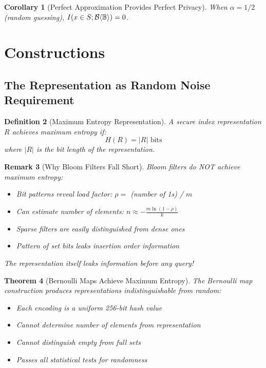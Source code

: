 \documentclass[11pt,final,hidelinks]{article}
\newcommand{\BernBool}{\mathcal{B}\langle \Bool \rangle}
\newcommand{\fprate}{\alpha}
\newtheorem{theorem}{Theorem}[section]
\newtheorem{corollary}[theorem]{Corollary}
\newtheorem{definition}[theorem]{Definition}
\newtheorem{remark}[theorem]{Remark}
\begin{document}
\begin{corollary}[Perfect Approximation Provides Perfect Privacy]
When $\fprate = 1/2$ (random guessing), $\MutInfo{x \in S}{\BernBool} = 0$.
\end{corollary}

\section{Constructions}

\subsection{The Representation as Random Noise Requirement}

\begin{definition}[Maximum Entropy Representation]
A secure index representation $R$ achieves maximum entropy if:
\begin{equation}
H(R) = |R| \text{ bits}
\end{equation}
where $|R|$ is the bit length of the representation.
\end{definition}

\begin{remark}[Why Bloom Filters Fall Short]
Bloom filters do NOT achieve maximum entropy:
\begin{itemize}
    \item Bit patterns reveal load factor: $\rho = $ (number of 1s) / $m$
    \item Can estimate number of elements: $n \approx -\frac{m \ln(1-\rho)}{k}$
    \item Sparse filters are easily distinguished from dense ones
    \item Pattern of set bits leaks insertion order information
\end{itemize}
The representation itself leaks information before any query!
\end{remark}

\begin{theorem}[Bernoulli Maps Achieve Maximum Entropy]
The Bernoulli map construction produces representations indistinguishable from random:
\begin{itemize}
    \item Each encoding is a uniform 256-bit hash value
    \item Cannot determine number of elements from representation
    \item Cannot distinguish empty from full sets
    \item Passes all statistical tests for randomness
\end{itemize}
\end{theorem}
\end{document}
